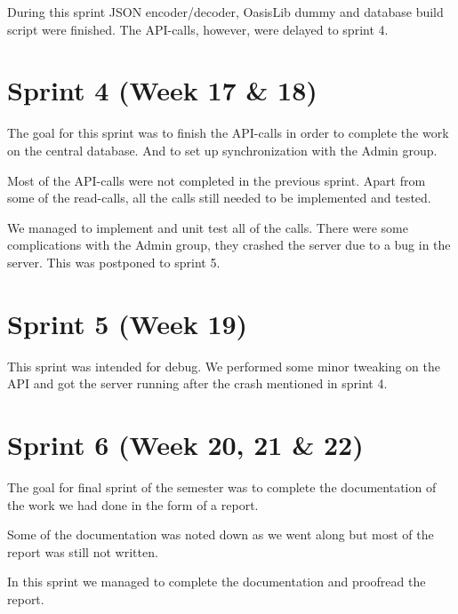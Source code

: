During this sprint JSON encoder/decoder, OasisLib dummy and database build script were finished. The API-calls, however, were delayed to sprint 4.

\section{Sprint 4 (Week 17 \& 18)}
The goal for this sprint was to finish the API-calls in order to complete the work on the central database. And to set up synchronization with the Admin group.

Most of the API-calls were not completed in the previous sprint. Apart from some of the read-calls, all the calls still needed to be implemented and tested. 

We managed to implement and unit test all of the calls. There were some complications with the Admin group, they crashed the server due to a bug in the server. This was postponed to sprint 5.  

\section{Sprint 5 (Week 19)}
This sprint was intended for debug. We performed some minor tweaking on the API and got the server running after the crash mentioned in sprint 4.

\section{Sprint 6 (Week 20, 21 \& 22)}
The goal for final sprint of the semester was to complete the documentation of the work we had done in the form of a report.

Some of the documentation was noted down as we went along but most of the report was still not written. 

In this sprint we managed to complete the documentation and proofread the report.

